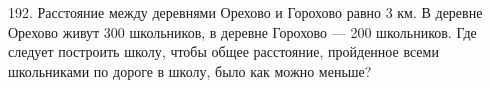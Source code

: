 192. Расстояние между деревнями Орехово и Горохово равно 3 км. В деревне Орехово живут 300 школьников, в деревне Горохово --- 200 школьников. Где следует построить школу, чтобы общее расстояние, пройденное всеми школьниками по дороге в школу, было как можно меньше?\\
